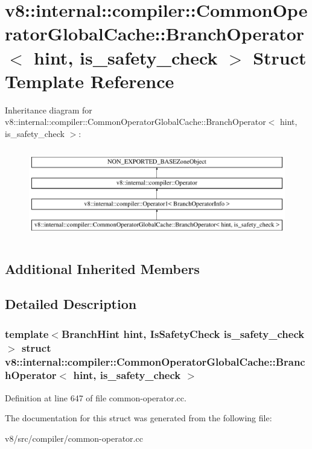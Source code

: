 \hypertarget{structv8_1_1internal_1_1compiler_1_1CommonOperatorGlobalCache_1_1BranchOperator}{}\section{v8\+:\+:internal\+:\+:compiler\+:\+:Common\+Operator\+Global\+Cache\+:\+:Branch\+Operator$<$ hint, is\+\_\+safety\+\_\+check $>$ Struct Template Reference}
\label{structv8_1_1internal_1_1compiler_1_1CommonOperatorGlobalCache_1_1BranchOperator}
Inheritance diagram for v8\+:\+:internal\+:\+:compiler\+:\+:Common\+Operator\+Global\+Cache\+:\+:Branch\+Operator$<$ hint, is\+\_\+safety\+\_\+check $>$\+:\begin{figure}[H]
\begin{center}
\leavevmode
\includegraphics[height=4.000000cm]{structv8_1_1internal_1_1compiler_1_1CommonOperatorGlobalCache_1_1BranchOperator}
\end{center}
\end{figure}
\subsection*{Additional Inherited Members}


\subsection{Detailed Description}
\subsubsection*{template$<$Branch\+Hint hint, Is\+Safety\+Check is\+\_\+safety\+\_\+check$>$\newline
struct v8\+::internal\+::compiler\+::\+Common\+Operator\+Global\+Cache\+::\+Branch\+Operator$<$ hint, is\+\_\+safety\+\_\+check $>$}



Definition at line 647 of file common-\/operator.\+cc.



The documentation for this struct was generated from the following file\+:\begin{DoxyCompactItemize}
\item 
v8/src/compiler/common-\/operator.\+cc\end{DoxyCompactItemize}
